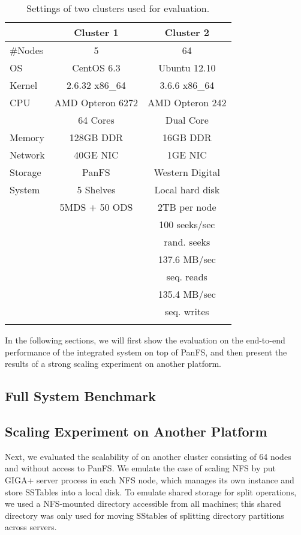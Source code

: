 \begin{footnotesize}
\begin{table}
\begin{tabular}{lcc}
\toprule
      & Cluster 1 & Cluster 2 \\
\midrule
\#Nodes & 5 & 64 \\
\hline
OS &   CentOS 6.3 &  Ubuntu 12.10 \\
Kernel & 2.6.32 x86\_64 & 3.6.6 x86\_64 \\
\hline
CPU & AMD Opteron 6272 &  AMD Opteron 242 \\
    & 64 Cores & Dual Core\\
\hline
Memory & 128GB DDR &  16GB DDR \\
\hline
Network & 40GE NIC &  1GE NIC  \\
\hline
Storage & PanFS & Western Digital \\
System &      5 Shelves & Local hard disk  \\
       &   5MDS + 50 ODS &  2TB per node  \\
& & 100 seeks/sec \\
& & rand. seeks   \\
& & 137.6 MB/sec  \\
& & seq. reads    \\
& & 135.4 MB/sec  \\
& & seq. writes   \\
\bottomrule \\
\end{tabular}
\caption{
\textsf{\footnotesize Settings of two clusters used for evaluation.}
}
\label{tab:setting}
\end{table}
\end{footnotesize}

In the following sections, we will first show the evaluation
on the end-to-end performance of the integrated system on top of PanFS,
and then present the results of a strong scaling experiment on another platform.

\subsection{Full System Benchmark}
\label{sec:fullsystem}


\subsection{Scaling Experiment on Another Platform}
Next, we evaluated the scalability of \sys on another cluster
consisting of 64 nodes and without access to PanFS.
We emulate the case of scaling NFS by put GIGA+ server process in each NFS node,
which manages its own \tfs instance and store SSTables into a local disk.
To emulate shared storage for split operations,
we used a NFS-mounted directory accessible from all machines;
this shared directory was only used for moving SStables of
splitting directory partitions across servers.

